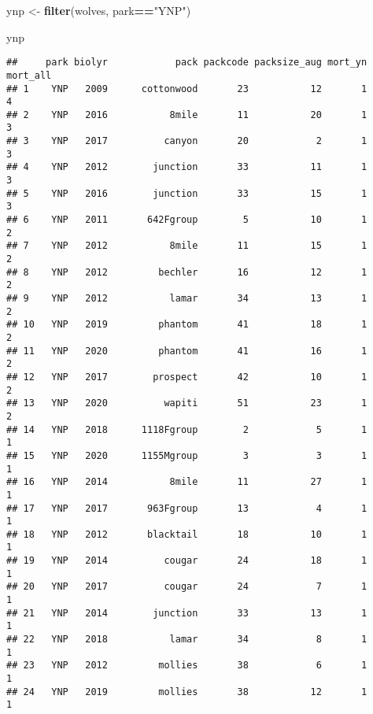 \documentclass[
]{article}
\newenvironment{Shaded}{\begin{snugshade}}{\end{snugshade}}
\newcommand{\FunctionTok}[1]{\textcolor[rgb]{0.13,0.29,0.53}{\textbf{#1}}}
\newcommand{\NormalTok}[1]{#1}
\newcommand{\OtherTok}[1]{\textcolor[rgb]{0.56,0.35,0.01}{#1}}
\newcommand{\SpecialCharTok}[1]{\textcolor[rgb]{0.81,0.36,0.00}{\textbf{#1}}}
\newcommand{\StringTok}[1]{\textcolor[rgb]{0.31,0.60,0.02}{#1}}
\begin{document}
\begin{Shaded}
\begin{Highlighting}[]
\NormalTok{ynp }\OtherTok{\textless{}{-}} \FunctionTok{filter}\NormalTok{(wolves, park}\SpecialCharTok{==}\StringTok{"YNP"}\NormalTok{)}
\end{Highlighting}
\end{Shaded}

\begin{Shaded}
\begin{Highlighting}[]
\NormalTok{ynp}
\end{Highlighting}
\end{Shaded}

\begin{verbatim}
##     park biolyr            pack packcode packsize_aug mort_yn mort_all
## 1    YNP   2009      cottonwood       23           12       1        4
## 2    YNP   2016           8mile       11           20       1        3
## 3    YNP   2017          canyon       20            2       1        3
## 4    YNP   2012        junction       33           11       1        3
## 5    YNP   2016        junction       33           15       1        3
## 6    YNP   2011       642Fgroup        5           10       1        2
## 7    YNP   2012           8mile       11           15       1        2
## 8    YNP   2012         bechler       16           12       1        2
## 9    YNP   2012           lamar       34           13       1        2
## 10   YNP   2019         phantom       41           18       1        2
## 11   YNP   2020         phantom       41           16       1        2
## 12   YNP   2017        prospect       42           10       1        2
## 13   YNP   2020          wapiti       51           23       1        2
## 14   YNP   2018      1118Fgroup        2            5       1        1
## 15   YNP   2020      1155Mgroup        3            3       1        1
## 16   YNP   2014           8mile       11           27       1        1
## 17   YNP   2017       963Fgroup       13            4       1        1
## 18   YNP   2012       blacktail       18           10       1        1
## 19   YNP   2014          cougar       24           18       1        1
## 20   YNP   2017          cougar       24            7       1        1
## 21   YNP   2014        junction       33           13       1        1
## 22   YNP   2018           lamar       34            8       1        1
## 23   YNP   2012         mollies       38            6       1        1
## 24   YNP   2019         mollies       38           12       1        1

\end{verbatim}
\end{document}
